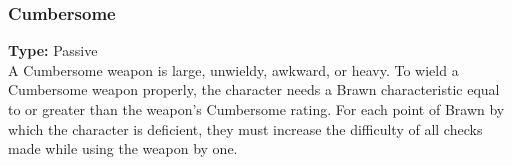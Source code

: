 \subsubsection{Cumbersome}
\label{iqty:cumbersome}
\textbf{Type:} Passive\\
A Cumbersome weapon is large, unwieldy, awkward,
or heavy. To wield a Cumbersome weapon properly,
the character needs a Brawn characteristic equal to
or greater than the weapon’s Cumbersome rating. For
each point of Brawn by which the character is deficient,
they must increase the difficulty of all checks made
while using the weapon by one.

